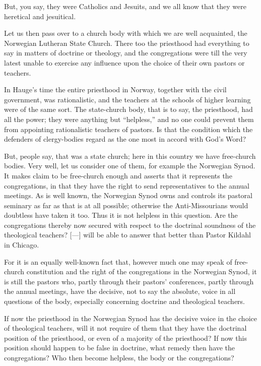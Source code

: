 But, you say, they were Catholics and Jesuits, and we all know that they were heretical and jesuitical.

Let us then pass over to a church body with which we are well acquainted, the Norwegian Lutheran State Church. There too the priesthood had everything to say in matters of doctrine or theology, and the congregations were till the very latest unable to exercise any influence upon the choice of their own pastors or teachers.

In Hauge’s time the entire priesthood in Norway, together with the civil government, was rationalistic, and the teachers at the schools of higher learning were of the same sort. The state-church body, that is to say, the priesthood, had all the power; they were anything but “helpless,” and no one could prevent them from appointing rationalistic teachers of pastors. Is that the condition which the defenders of clergy-bodies regard as the one most in accord with God’s Word?

But, people say, that was a state church; here in this country we have free-church bodies. Very well, let us consider one of them, for example the Norwegian Synod. It makes claim to be free-church enough and asserts that it represents the congregations, in that they have the right to send representatives to the annual meetings. As is well known, the Norwegian Synod owns and controls its pastoral seminary as far as that is at all possible; otherwise the Anti-Missourians would doubtless have taken it too. Thus it is not helpless in this question. Are the congregations thereby now secured with respect to the doctrinal soundness of the theological teachers? [—] will be able to answer that better than Pastor Kildahl in Chicago.

For it is an equally well-known fact that, however much one may speak of free-church constitution and the right of the congregations in the Norwegian Synod, it is still the pastors who, partly through their pastors’ conferences, partly through the annual meetings, have the decisive, not to say the absolute, voice in all questions of the body, especially concerning doctrine and theological teachers.

If now the priesthood in the Norwegian Synod has the decisive voice in the choice of theological teachers, will it not require of them that they have the doctrinal position of the priesthood, or even of a majority of the priesthood? If now this position should happen to be false in doctrine, what remedy then have the congregations? Who then become helpless, the body or the congregations?

